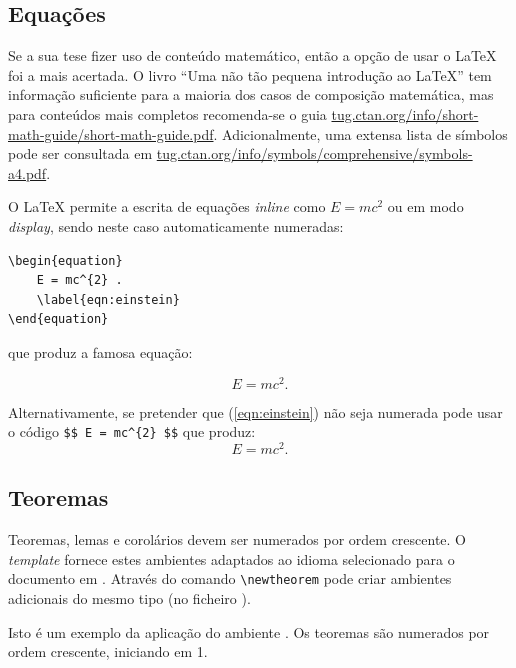 \subsection{Equações}

Se a sua tese fizer uso de conteúdo matemático, então a opção de usar o \LaTeX{} foi a mais acertada. O livro ``Uma não tão pequena introdução ao \LaTeX{}'' tem informação suficiente para a maioria dos casos de composição matemática, mas para conteúdos mais completos recomenda-se o guia \url{tug.ctan.org/info/short-math-guide/short-math-guide.pdf}. Adicionalmente, uma extensa lista de símbolos pode ser consultada em \url{tug.ctan.org/info/symbols/comprehensive/symbols-a4.pdf}.

O \LaTeX{} permite a escrita de equações \textit{inline} como $E = mc^{2}$ ou em modo \textit{display}, sendo neste caso  automaticamente numeradas:

\begin{verbatim}
\begin{equation}
	E = mc^{2} .
	\label{eqn:einstein}
\end{equation}
\end{verbatim}

\noindent que produz a famosa equação:

\begin{equation}
E = mc^{2} .
\label{eqn:einstein}
\end{equation}

Alternativamente, se pretender que (\ref{eqn:einstein}) não seja numerada pode usar o código \verb|$$ E = mc^{2} $$| que produz:
$$ E = mc^{2} .$$


\subsection{Teoremas}

Teoremas, lemas e corolários devem ser numerados por ordem crescente. O \textit{template} fornece estes ambientes adaptados ao idioma selecionado para o documento em . Através do comando \verb|\newtheorem| pode criar ambientes adicionais do mesmo tipo (no ficheiro ). 

\begin{theorem}
Isto é um exemplo da aplicação do ambiente . Os teoremas são numerados por ordem crescente, iniciando em 1.
\end{theorem}

